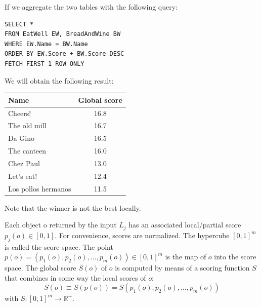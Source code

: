 \documentclass[12pt, a4paper]{report}
\begin{document}
\begin{example}
\begin{table}[H]
        \end{table}
        If we aggregate the two tables with the following query: 
        \begin{lstlisting}[style=SQL]
SELECT *
FROM EatWell EW, BreadAndWine BW
WHERE EW.Name = BW.Name
ORDER BY EW.Score + BW.Score DESC
FETCH FIRST 1 ROW ONLY 
        \end{lstlisting}
        We will obtain the following result: 
        \begin{table}[H]
            \centering
            \begin{tabular}{|lc|}
            \hline
            \textbf{Name}       & \textbf{Global score} \\ \hline
            Cheers!             & 16.8                  \\ \hline
            The old mill        & 16.7                  \\ \hline
            Da Gino             & 16.5                  \\ \hline
            The canteen         & 16.0                  \\ \hline
            Chez Paul           & 13.0                  \\ \hline
            Let's eat!          & 12.4                  \\ \hline
            Los pollos hermanos & 11.5                  \\ \hline
            \end{tabular}
        \end{table}
        Note that the winner is not the best locally. 
    \end{example}
    Each object o returned by the input $L_j$ has an associated local/partial score $p_j(o) \in [0,1]$. For convenience, scores are normalized. The hypercube $[0,1]^m$ 
    is called the score space. The point $p(o) = (p_1(o),p_2(o),\dots,p_m(o)) \in [0,1]^m$ is the map of $o$ into the score space. The global score $S(o)$ of $o$ is 
    computed by means of a scoring function $S$ that combines in some way the local scores of $o$:
    \[S(o) \equiv  S(p(o)) = S(p_1(o),p_2(o),\dots,p_m(o))\]
    with $S:[0,1]^m \rightarrow \mathbb{R}^{+}$. 
\end{document}
